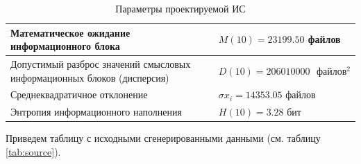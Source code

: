 \documentclass[a4paper,14pt]{extarticle}
\begin{document}
\begin{table}[h!]
	\centering
	\caption{Параметры проектируемой ИС}
	\begin{tabular}{|p{0.6\linewidth}|p{0.4\linewidth}|}
		\hline
		Математическое ожидание информационного блока & $M(10) = 23199.50$ файлов\\\hline
		Допустимый разброс значений смысловых
		информационных блоков (дисперсия) & $D(10) = 206010000\mbox{ }файлов^2$ \\\hline
		Среднеквадратичное отклонение & $\sigma x_i=14353.05\mbox{ файлов}$	\\\hline
		Энтропия информационного наполнения & $H(10) = 3.28 $ бит \\\hline
	\end{tabular}
\end{table}
Приведем таблицу с исходными сгенерированными данными (см. таблицу \ref{tab:source}).
\end{document}
